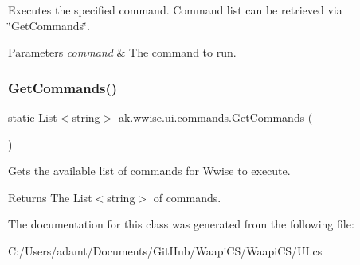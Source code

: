 Executes the specified command. Command list can be retrieved via \char`\"{}\+Get\+Commands\char`\"{}. 


\begin{DoxyParams}{Parameters}
{\em command} & The command to run.\\
\hline
\end{DoxyParams}
\mbox{\label{classak_1_1wwise_1_1ui_1_1commands_a094dd580f67690f17ed4d4b4ec0ce8bf}} 
\subsubsection{\texorpdfstring{Get\+Commands()}{GetCommands()}}
{\footnotesize\ttfamily static List$<$string$>$ ak.\+wwise.\+ui.\+commands.\+Get\+Commands (\begin{DoxyParamCaption}{ }\end{DoxyParamCaption})\hspace{0.3cm}{\ttfamily [static]}}



Gets the available list of commands for Wwise to execute. 

\begin{DoxyReturn}{Returns}
The List$<$string$>$ of commands.
\end{DoxyReturn}


The documentation for this class was generated from the following file\+:\begin{DoxyCompactItemize}
\item 
C\+:/\+Users/adamt/\+Documents/\+Git\+Hub/\+Waapi\+C\+S/\+Waapi\+C\+S/U\+I.\+cs\end{DoxyCompactItemize}

